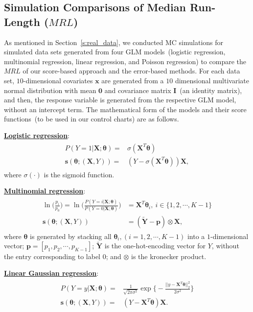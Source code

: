 \documentclass[twoside,11pt]{article}
\begin{document}
\begin{appendices}

\section{Simulation Comparisons of Median Run-Length ($MRL$)}
\label{app:simu_MRL}
As mentioned in Section~\ref{s:real_data}, we conducted MC simulations for simulated data sets generated from four GLM models~(logistic regression, multinomial regression, linear regression, and Poisson regression) to compare the $MRL$ of our score-based approach and the error-based methods. For each data set, $10$-dimensional covariates $\bm{x}$ are generated from a $10$ dimensional multivariate normal distribution with mean $\bm{0}$ and covariance matrix $\mathbf {I}$~(an identity matrix), and then, the response variable is generated from the respective GLM model, without an intercept term. The mathematical form of the models and their score functions~(to be used in our control charts) are as follows.

\noindent
\underline{\textbf{Logistic regression}}:
\begin{align}
\begin{aligned}
P(Y=1|\bm{X};\bm{\theta}) =& \sigma ( \bm {X}^T\bm { \theta}) \\
\bm{s}(\bm { \theta};(\bm {X}, Y)) =&  (Y- \sigma (\bm {X}^T\bm { \theta} )) \bm {X},
\end{aligned}
\label{eqn:logis_score}
\end{align}
where $ \sigma ( \cdot)$ is the sigmoid function.

\noindent
\underline{\textbf{Multinomial regression}}:
\begin{align}
\begin{aligned}
\ln \big(\frac{p_i}{p_0}\big) = \ln \big(\frac{P(Y=i|\bm{X};\bm{\theta})}{P(Y=0|\bm{X};\bm{\theta})}\big)&=\bm {X}^{T} \bm { \theta}_i, ~ i \in \{1,2,\cdots,K-1\} \\
\bm {s}(\bm { \theta} ; (\bm {X}, Y)) &= (\tilde{\bm{Y}}-\bm {p})\otimes \bm {X},
\end{aligned}
\label{eqn:multi_score}
\end{align}
where $\bm { \theta} $ is generated by stacking all $ \bm { \theta}_i , (i=1,2,\cdots,K-1)$ into a $1$-dimensional vector; $\bm {p}=[p_1, p_2, \cdots, p _{K-1}]$; $\tilde{\bm{Y}}$ is the one-hot-encoding vector for $Y$, without the entry corresponding to label $0$; and $\otimes$ is the kronecker product.

\noindent
\underline{\textbf{Linear Gaussian regression}}:
\begin{align}
\begin{aligned}
P(Y=y|\bm{X};\bm{\theta})=& \frac{1}{\sqrt{2\pi\sigma^2}}\exp{\big\{-\frac{||y-\bm{X}^T\bm{\theta}||_2^2}{2\sigma^2} \big\}} \\
\bm{s}(\bm { \theta};(\bm {X}, Y)) =& (Y - \bm {X}^T\bm { \theta} ) \bm {X}.
\end{aligned}
\label{eqn:lin_score}
\end{align}


\end{appendices}
\end{document}
